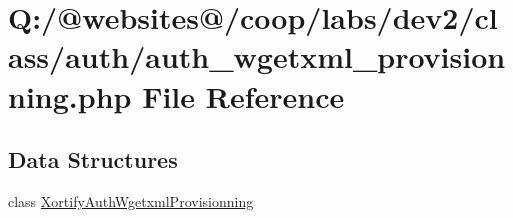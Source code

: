 \hypertarget{auth__wgetxml__provisionning_8php}{\section{Q\-:/@websites@/coop/labs/dev2/class/auth/auth\-\_\-wgetxml\-\_\-provisionning.php File Reference}
\label{auth__wgetxml__provisionning_8php}
}
\subsection*{Data Structures}
\begin{DoxyCompactItemize}
\item 
class \hyperlink{class_xortify_auth_wgetxml_provisionning}{Xortify\-Auth\-Wgetxml\-Provisionning}
\end{DoxyCompactItemize}
